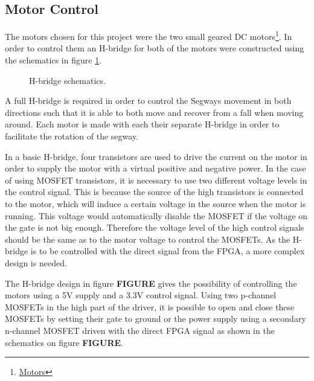 
\subsection{Motor Control}
The motors chosen for this project were the two small geared DC motors\footnote{ \href{https://www.sparkfun.com/products/13258}{Motors}}.
In order to control them an H-bridge for both of the motors were constructed using the schematics in figure \ref{fig:hbridge}.


\begin{figure}[H]
\centering

\caption{H-bridge schematics.}
\label{fig:hbridge}
\end{figure}

A full H-bridge is required in order to control the Segways movement in both directions such that it is able to both move and recover from a fall when moving around.
Each motor is made with each their separate H-bridge in order to facilitate the rotation of the segway.

In a basic H-bridge, four transistors are used to drive the current on the motor in order to supply the motor with a virtual positive and negative power.
In the case of using MOSFET transistors, it is necessary to use two different voltage levels in the control signal.
This is because the source of the high transistors is connected to the motor, which will induce a certain voltage in the source when the motor is running.
This voltage would automatically disable the MOSFET if the voltage on the gate is not big enough.
Therefore the voltage level of the high control signals should be the same as to the motor voltage to control the MOSFETs.
As the H-bridge is to be controlled with the direct signal from the FPGA, a more complex design is needed.

The H-bridge design in figure \textbf{FIGURE} gives the possibility of controlling the motors using a 5V supply and a 3.3V control signal.
Using two p-channel MOSFETs in the high part of the driver, it is possible to open and close these MOSFETs by setting their gate to ground or the power supply using a secondary n-channel MOSFET driven with the direct FPGA signal as shown in the schematics on figure \textbf{FIGURE}.

